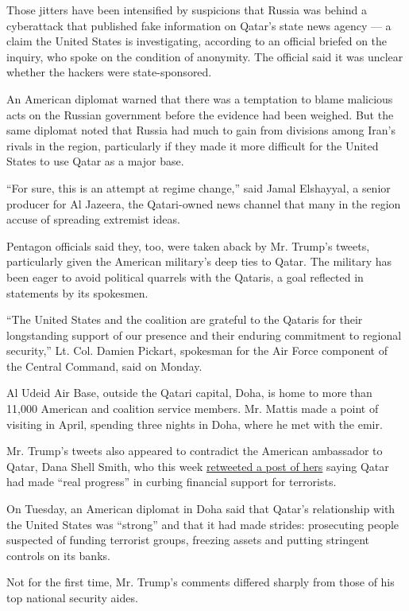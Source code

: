 Those jitters have been intensified by suspicions that Russia was behind
a cyberattack that published fake information on Qatar's state news
agency --- a claim the United States is investigating, according to an
official briefed on the inquiry, who spoke on the condition of
anonymity. The official said it was unclear whether the hackers were
state-sponsored.

An American diplomat warned that there was a temptation to blame
malicious acts on the Russian government before the evidence had been
weighed. But the same diplomat noted that Russia had much to gain from
divisions among Iran's rivals in the region, particularly if they made
it more difficult for the United States to use Qatar as a major base.

``For sure, this is an attempt at regime change,'' said Jamal Elshayyal,
a senior producer for Al Jazeera, the Qatari-owned news channel that
many in the region accuse of spreading extremist ideas.

Pentagon officials said they, too, were taken aback by Mr. Trump's
tweets, particularly given the American military's deep ties to Qatar.
The military has been eager to avoid political quarrels with the
Qataris, a goal reflected in statements by its spokesmen.

``The United States and the coalition are grateful to the Qataris for
their longstanding support of our presence and their enduring commitment
to regional security,'' Lt. Col. Damien Pickart, spokesman for the Air
Force component of the Central Command, said on Monday.

Al Udeid Air Base, outside the Qatari capital, Doha, is home to more
than 11,000 American and coalition service members. Mr. Mattis made a
point of visiting in April, spending three nights in Doha, where he met
with the emir.

Mr. Trump's tweets also appeared to contradict the American ambassador
to Qatar, Dana Shell Smith, who this week
\href{https://twitter.com/AmbDana/status/871593197708787712}{retweeted a
post of hers} saying Qatar had made ``real progress'' in curbing
financial support for terrorists.

On Tuesday, an American diplomat in Doha said that Qatar's relationship
with the United States was ``strong'' and that it had made strides:
prosecuting people suspected of funding terrorist groups, freezing
assets and putting stringent controls on its banks.

Not for the first time, Mr. Trump's comments differed sharply from those
of his top national security aides.

